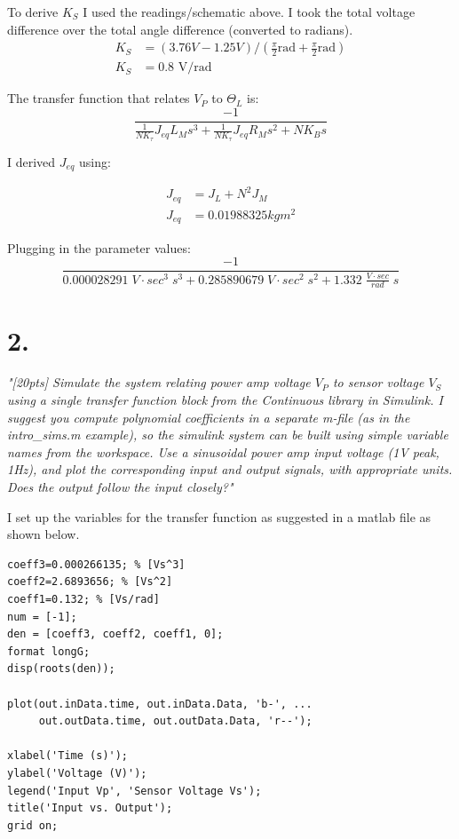 \documentclass{article}
\begin{document}
To derive $K_S$ I used the readings/schematic above.
I took the total voltage difference over the total angle difference (converted to radians).
\begin{align}
    K_S&=(3.76V-1.25V)/(\frac{\pi}{2}\text{rad}+\frac{\pi}{2}\text{rad}) \\
    K_S&=0.8\text{ V/rad}
\end{align}

The transfer function that relates $V_P$ to $\Theta_L$ is:
\begin{equation}
    \frac{-1}{\frac{1}{NK_{\tau}}J_{eq}L_Ms^3 + \frac{1}{NK_{\tau}}J_{eq}R_Ms^2+NK_Bs}
\end{equation} 

I derived $J_{eq}$ using:

\begin{align*}
    J_{eq} &= J_L + N^2J_M \\
    J_{eq} &= 0.01988325kgm^2
\end{align*}

Plugging in the parameter values:
\begin{equation}
    \frac{-1}{0.000028291\;V\cdot sec^3 \;s^3 + 0.285890679\;V\cdot sec^2\;s^2+1.332\;\frac{V\cdot sec}{rad}\;s}
\end{equation} 

\section*{2.}

\textit{
    "[20pts] Simulate the system relating power amp voltage $V_P$ to sensor voltage $V_S$ using a single
    transfer function block from the Continuous library in Simulink. I suggest you compute
    polynomial coefficients in a separate m-file (as in the intro\_sims.m example), so the simulink
    system can be built using simple variable names from the workspace. Use a sinusoidal power
    amp input voltage (1V peak, 1Hz), and plot the corresponding input and output signals, with
    appropriate units. Does the output follow the input closely?"
}

I set up the variables for the transfer function as suggested in a matlab file as shown below.

\begin{lstlisting}[style=matlabstyle]
coeff3=0.000266135; % [Vs^3]
coeff2=2.6893656; % [Vs^2]
coeff1=0.132; % [Vs/rad]
num = [-1];
den = [coeff3, coeff2, coeff1, 0];
format longG;
disp(roots(den));

plot(out.inData.time, out.inData.Data, 'b-', ...
     out.outData.time, out.outData.Data, 'r--');

xlabel('Time (s)');
ylabel('Voltage (V)');
legend('Input Vp', 'Sensor Voltage Vs');
title('Input vs. Output');
grid on;
\end{lstlisting}
\end{document}
